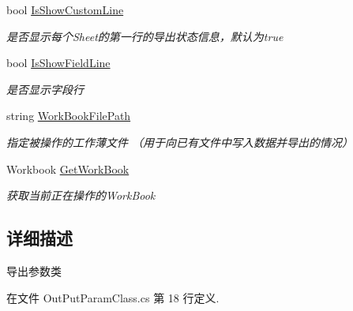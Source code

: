 \begin{DoxyCompactItemize}
bool \hyperlink{class_x_c_l_net_tools_1_1_entity_1_1_office_1_1_excel_handler_1_1_out_put_param_class_a6fca02e4b0654506b9bcc19b690a3ed8}{Is\+Show\+Custom\+Line}
\begin{DoxyCompactList}\small\item\em 是否显示每个\+Sheet的第一行的导出状态信息，默认为true \end{DoxyCompactList}\item 
bool \hyperlink{class_x_c_l_net_tools_1_1_entity_1_1_office_1_1_excel_handler_1_1_out_put_param_class_a6003391938fd21744be4f6bb16cf89d9}{Is\+Show\+Field\+Line}
\begin{DoxyCompactList}\small\item\em 是否显示字段行 \end{DoxyCompactList}\item 
string \hyperlink{class_x_c_l_net_tools_1_1_entity_1_1_office_1_1_excel_handler_1_1_out_put_param_class_a5b29724ec341728c000b509ec1a5e5bc}{Work\+Book\+File\+Path}
\begin{DoxyCompactList}\small\item\em 指定被操作的工作薄文件 （用于向已有文件中写入数据并导出的情况） \end{DoxyCompactList}\item 
Workbook \hyperlink{class_x_c_l_net_tools_1_1_entity_1_1_office_1_1_excel_handler_1_1_out_put_param_class_a953f3019c51e0fff8f6ec14dbe3cc10d}{Get\+Work\+Book}
\begin{DoxyCompactList}\small\item\em 获取当前正在操作的\+Work\+Book \end{DoxyCompactList}\end{DoxyCompactItemize}


\subsection{详细描述}
导出参数类 



在文件 Out\+Put\+Param\+Class.\+cs 第 18 行定义.



